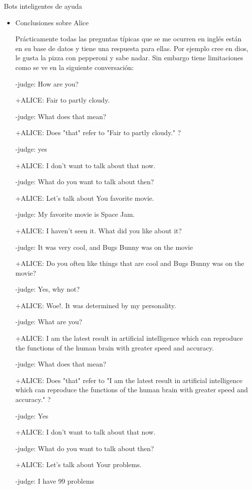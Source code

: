 \documentclass[spanish, a4paper, 12pt]{article} 	%
\begin{document}
\begin{section}{Bots inteligentes de ayuda}
\begin{itemize}
\begin{itemize}
		\item{Conclusiones sobre Alice}
			
			Prácticamente todas las preguntas típicas que se me ocurren en inglés están en su base de datos y tiene una respuesta para ellas. Por ejemplo cree en dios, le gusta la pizza con pepperoni y sabe nadar. Sin embargo tiene limitaciones como se ve en la siguiente conversación:
			
			-judge: How are you? 
			
			+ALICE: Fair to partly cloudy. 

			-judge: What does that mean? 

			+ALICE: Does "that" refer to "Fair to partly cloudy." ? 

			-judge: yes 

			+ALICE: I don't want to talk about that now. 

			-judge: What do you want to talk about then? 

			+ALICE: Let's talk about You favorite movie. 

			-judge: My favorite movie is Space Jam. 

			+ALICE: I haven't seen it. What did you like about it? 

			-judge: It was very cool, and Bugs Bunny was on the movie 

			+ALICE: Do you often like things that are cool and Bugs Bunny was on the movie? 

			-judge: Yes, why not? 

			+ALICE: Woe!. It was determined by my personality. 

			-judge: What are you? 

			+ALICE: I am the latest result in artificial intelligence which can reproduce the functions of the human brain with greater speed and accuracy. 

			-judge: What does that mean? 

			+ALICE: Does "that" refer to "I am the latest result in artificial intelligence which can reproduce the functions of the human brain with greater speed and accuracy." ? 

			-judge: Yes 

			+ALICE: I don't want to talk about that now. 

			-judge: What do you want to talk about then? 

			+ALICE: Let's talk about Your problems. 

			-judge: I have 99 problems 


\end{itemize}
\end{itemize}
\end{section}
\end{document}
